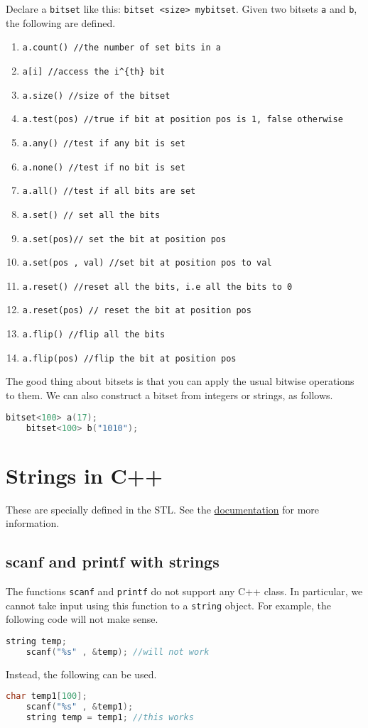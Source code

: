 \documentclass[12pt,a4paper]{amsart}
\numberwithin{equation}{section}
\theoremstyle{definition}
\begin{document}
Declare a \verb|bitset| like this: \verb|bitset <size> mybitset|. Given two bitsets \verb|a| and \verb|b|, the following are defined. 
\begin{enumerate}
    \item \verb|a.count() //the number of set bits in a|
    \item \verb|a[i] //access the i^{th} bit|
    \item \verb|a.size() //size of the bitset|
    \item \verb|a.test(pos) //true if bit at position pos is 1, false otherwise|
    \item \verb|a.any() //test if any bit is set|
    \item \verb|a.none() //test if no bit is set|
    \item \verb|a.all() //test if all bits are set|
    \item \verb|a.set() // set all the bits|
    \item \verb|a.set(pos)// set the bit at position pos|
    \item \verb|a.set(pos , val) //set bit at position pos to val|
    \item \verb|a.reset() //reset all the bits, i.e all the bits to 0|
    \item \verb|a.reset(pos) // reset the bit at position pos|
    \item \verb|a.flip() //flip all the bits|
    \item \verb|a.flip(pos) //flip the bit at position pos|
\end{enumerate}

The good thing about bitsets is that you can apply the usual bitwise operations to them. We can also construct a bitset from integers or strings, as follows. 
\begin{lstlisting}[language=C++]
    bitset<100> a(17);
    bitset<100> b("1010");
\end{lstlisting}

\section{Strings in C++} 
\noindent These are specially defined in the STL. See the \href{http://www.cplusplus.com/reference/string/string/}{documentation} for more information. 

\subsection{scanf and printf with strings} The functions \verb|scanf| and \verb|printf| do not support any C++ class. In particular, we cannot take input using this function to a \verb|string| object. For example, the following code will not make sense.
\begin{lstlisting}[language=C++]
    string temp;
    scanf("%s" , &temp); //will not work
\end{lstlisting}
Instead, the following can be used. 
\begin{lstlisting}[language=C++]
    char temp1[100];
    scanf("%s" , &temp1);
    string temp = temp1; //this works
\end{lstlisting}
\end{document}
